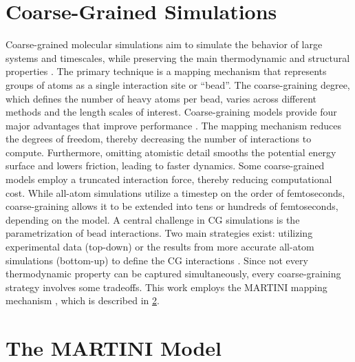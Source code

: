 \documentclass[
    11pt,
    a4paper,
    oneside,        %
    BCOR=10mm,      %
    parskip=half,   %
    listof=nototoc,   %
    bibliography=totoc %
]{scrreprt}
\begin{document}
\section{Coarse-Grained Simulations}\label{sec:coarse-grained-simulations}

Coarse-grained molecular simulations aim to simulate the behavior of large systems and timescales, while preserving the main thermodynamic and structural properties \cite{Noid_cg}. The primary technique is a mapping mechanism that represents groups of atoms as a single interaction site or “bead”. The coarse-graining degree, which defines the number of heavy atoms per bead, varies across different methods and the length scales of interest. Coarse-graining models provide four major advantages that improve performance \cite{cg_review_speedups}. The mapping mechanism reduces the degrees of freedom, thereby decreasing the number of interactions to compute. Furthermore, omitting atomistic detail smooths the potential energy surface and lowers friction, leading to faster dynamics. Some coarse-grained models employ a truncated interaction force, thereby reducing computational cost. While all-atom simulations utilize a timestep on the order of femtoseconds\cite{Atomic_timescales}, coarse-graining allows it to be extended into tens or hundreds of femtoseconds, depending on the model. A central challenge in CG simulations is the parametrization of bead interactions. Two main strategies exist: utilizing experimental data (top-down) or the results from more accurate all-atom simulations (bottom-up) to define the CG interactions \cite{Noid_cg}. Since not every thermodynamic property can be captured simultaneously, every coarse-graining strategy involves some tradeoffs. This work employs the MARTINI mapping mechanism \cite{Martini}, which is described in \cref{martini}. 

\section{The MARTINI Model}\label{martini}
\end{document}
